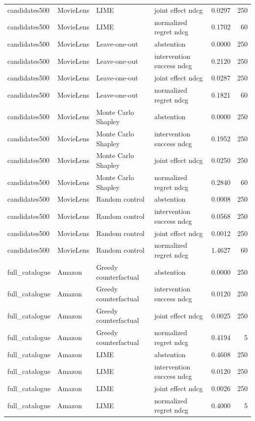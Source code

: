 \begin{longtable}{@{}p{}p{}p{}p{}rr@{}}
candidates500 & MovieLens & LIME & joint effect ndcg & 0.0297 & 250 \\
candidates500 & MovieLens & LIME & normalized regret ndcg & 0.1702 & 60 \\
candidates500 & MovieLens & Leave-one-out & abstention & 0.0000 & 250 \\
candidates500 & MovieLens & Leave-one-out & intervention success ndcg & 0.2120 & 250 \\
candidates500 & MovieLens & Leave-one-out & joint effect ndcg & 0.0287 & 250 \\
candidates500 & MovieLens & Leave-one-out & normalized regret ndcg & 0.1821 & 60 \\
candidates500 & MovieLens & Monte Carlo Shapley & abstention & 0.0000 & 250 \\
candidates500 & MovieLens & Monte Carlo Shapley & intervention success ndcg & 0.1952 & 250 \\
candidates500 & MovieLens & Monte Carlo Shapley & joint effect ndcg & 0.0250 & 250 \\
candidates500 & MovieLens & Monte Carlo Shapley & normalized regret ndcg & 0.2840 & 60 \\
candidates500 & MovieLens & Random control & abstention & 0.0008 & 250 \\
candidates500 & MovieLens & Random control & intervention success ndcg & 0.0568 & 250 \\
candidates500 & MovieLens & Random control & joint effect ndcg & 0.0012 & 250 \\
candidates500 & MovieLens & Random control & normalized regret ndcg & 1.4627 & 60 \\
full\_catalogue & Amazon & Greedy counterfactual & abstention & 0.0000 & 250 \\
full\_catalogue & Amazon & Greedy counterfactual & intervention success ndcg & 0.0120 & 250 \\
full\_catalogue & Amazon & Greedy counterfactual & joint effect ndcg & 0.0025 & 250 \\
full\_catalogue & Amazon & Greedy counterfactual & normalized regret ndcg & 0.4194 & 5 \\
full\_catalogue & Amazon & LIME & abstention & 0.4608 & 250 \\
full\_catalogue & Amazon & LIME & intervention success ndcg & 0.0120 & 250 \\
full\_catalogue & Amazon & LIME & joint effect ndcg & 0.0026 & 250 \\
full\_catalogue & Amazon & LIME & normalized regret ndcg & 0.4000 & 5 \\

\end{longtable}

